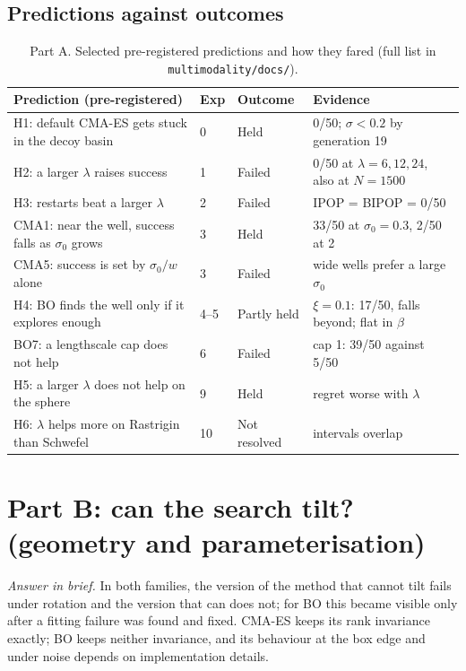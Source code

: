 \documentclass[10pt,a4paper]{article}
\begin{document}
\subsection{Predictions against outcomes}
\begin{table}[H]
\centering\footnotesize
\begin{tabular}{p{6.0cm}lp{1.9cm}p{6.0cm}}
\toprule
Prediction (pre-registered) & Exp & Outcome & Evidence \\
\midrule
H1: default CMA-ES gets stuck in the decoy basin & 0 & Held & 0/50; $\sigma<0.2$ by generation 19 \\
H2: a larger $\lambda$ raises success & 1 & Failed & 0/50 at $\lambda=6,12,24$, also at $N=1500$ \\
H3: restarts beat a larger $\lambda$ & 2 & Failed & IPOP = BIPOP = 0/50 \\
CMA1: near the well, success falls as $\sigma_0$ grows & 3 & Held & 33/50 at $\sigma_0=0.3$, 2/50 at 2 \\
CMA5: success is set by $\sigma_0/w$ alone & 3 & Failed & wide wells prefer a large $\sigma_0$ \\
H4: BO finds the well only if it explores enough & 4--5 & Partly held & $\xi=0.1$: 17/50, falls beyond; flat in $\beta$ \\
BO7: a lengthscale cap does not help & 6 & Failed & cap 1: 39/50 against 5/50 \\
H5: a larger $\lambda$ does not help on the sphere & 9 & Held & regret worse with $\lambda$ \\
H6: $\lambda$ helps more on Rastrigin than Schwefel & 10 & Not resolved & intervals overlap \\
\bottomrule
\end{tabular}
\caption{Part A. Selected pre-registered predictions and how they fared (full list in \texttt{multimodality/docs/}).}
\end{table}

\section{Part B: can the search tilt? (geometry and parameterisation)}\label{sec:partB}
\emph{Answer in brief.} In both families, the version of the method that cannot tilt fails under rotation and the
version that can does not; for BO this became visible only after a fitting failure was found and fixed. CMA-ES keeps
its rank invariance exactly; BO keeps neither invariance, and its behaviour at the box edge and under noise depends
on implementation details.
\end{document}
